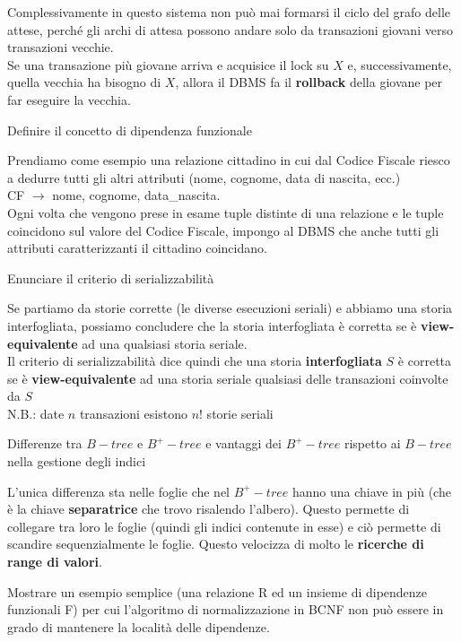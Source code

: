 \documentclass{exam}
\begin{document}
\begin{questions}
\begin{solution}
\begin{description}
            Complessivamente in questo sistema non può mai formarsi il ciclo del grafo delle attese, perché gli archi di attesa possono andare solo da transazioni giovani verso transazioni vecchie.\\
            Se una transazione più giovane arriva e acquisice il lock su $X$ e, successivamente, quella vecchia ha bisogno di $X$, allora il DBMS fa il \textbf{rollback} della giovane per far eseguire la vecchia.
        \end{description}
    \end{solution}
    \question Definire il concetto di dipendenza funzionale
    \begin{solution}
        Prendiamo come esempio una relazione cittadino in cui dal Codice Fiscale riesco a dedurre tutti gli altri attributi (nome, cognome, data di nascita, ecc.)\\
        CF $\rightarrow$ nome, cognome, data\_nascita.\\
        Ogni volta che vengono prese in esame tuple distinte di una relazione e le tuple coincidono sul valore del Codice Fiscale, 
        impongo al DBMS che anche tutti gli attributi caratterizzanti il cittadino coincidano.
    \end{solution}
    \question Enunciare il criterio di serializzabilità
    \begin{solution}
        Se partiamo da storie corrette (le diverse esecuzioni  seriali) e abbiamo una storia interfogliata, possiamo  concludere che la storia interfogliata è corretta se è \textbf{view-equivalente} ad una qualsiasi storia seriale.\\
        Il criterio di serializzabilità dice quindi che una storia \textbf{interfogliata} $S$ è corretta se è \textbf{view-equivalente} ad una storia seriale qualsiasi delle transazioni coinvolte da $S$ \\
        N.B.: date $n$ transazioni esistono $n!$ storie seriali
    \end{solution}
    \question Differenze tra $B-tree$ e $B^{+}-tree$ e vantaggi dei $B^{+}-tree$ rispetto ai $B-tree$ nella gestione degli indici
    \begin{solution}
        L'unica differenza sta nelle foglie che nel $B^{+}-tree$ hanno una chiave in più (che è la chiave \textbf{separatrice} che trovo risalendo l'albero). 
        Questo permette di collegare tra loro le foglie (quindi gli indici contenute in esse) e ciò permette di scandire sequenzialmente le foglie. Questo 
        velocizza di molto le \textbf{ricerche di range di valori}.
    \end{solution}
    \question Mostrare un esempio semplice (una relazione R ed un insieme di dipendenze funzionali F) per cui  l’algoritmo di normalizzazione in BCNF non può essere in grado di mantenere la località delle dipendenze. 
    \begin{solution}
        

\end{solution}
\end{questions}
\end{document}
